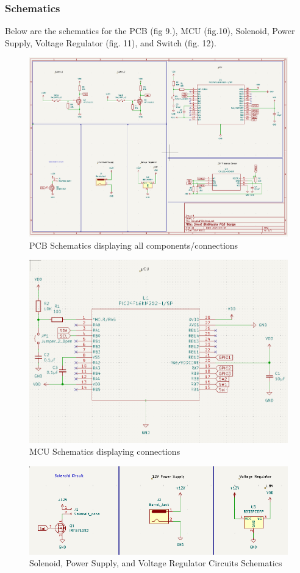 \documentclass[12pt,a4paper]{article}
\begin{document}
\subsubsection{Schematics}
Below are the schematics for the PCB (fig 9.), MCU (fig.10), Solenoid, Power Supply, Voltage Regulator (fig. 11), and Switch (fig. 12).
\begin{figure}[h]
    \centering
    \includegraphics[width=.75\textwidth]{images/BirdFeeder_Schematics.png}
    \caption{PCB Schematics displaying all components/connections}
\end{figure}
\begin{figure}[h]
    \centering
    \includegraphics[width=.75\textwidth]{images/MCU_Schematics.png}
    \caption{MCU Schematics displaying connections}
\end{figure}
\begin{figure}[h]
    \centering
    \includegraphics[width=.75\textwidth]{images/Solenoid_12VPower_VReg_Schematics.png}
    \caption{Solenoid, Power Supply, and Voltage Regulator Circuits Schematics}
\end{figure}
\end{document}
